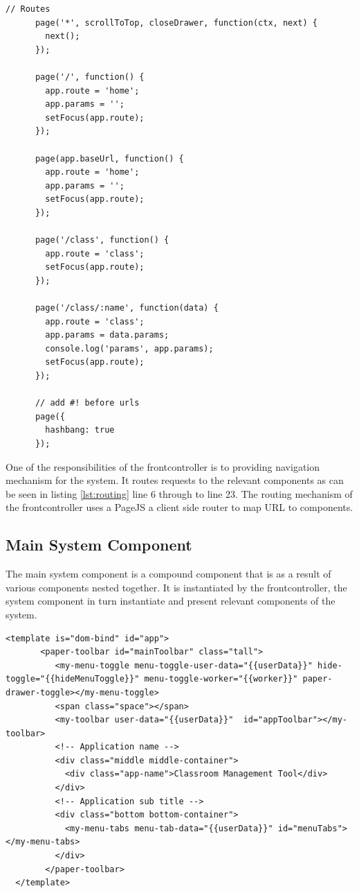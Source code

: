 \begin{lstlisting}[caption={Routing by frontcontroller}, label={lst:routing}]
    // Routes
      page('*', scrollToTop, closeDrawer, function(ctx, next) {
        next();
      });

      page('/', function() {
        app.route = 'home';
        app.params = '';
        setFocus(app.route);
      });

      page(app.baseUrl, function() {
        app.route = 'home';
        app.params = '';
        setFocus(app.route);
      });

      page('/class', function() {
        app.route = 'class';
        setFocus(app.route);
      });

      page('/class/:name', function(data) {
        app.route = 'class';
        app.params = data.params;
        console.log('params', app.params);
        setFocus(app.route);
      });

      // add #! before urls
      page({
        hashbang: true
      });
\end{lstlisting}

One of the responsibilities of the frontcontroller is to providing navigation mechanism for the system. It routes requests to the relevant components as can be seen in listing \ref{lst:routing} line 6 through to line 23. The routing mechanism of the frontcontroller uses a PageJS \cite{website:VisionMedia} a client side router to map URL to components.  

\subsection{Main System Component}
The main system component is a compound component that is as a result of various components nested together. It is instantiated by the frontcontroller, the system component in turn instantiate and present relevant components of the system.

\begin{lstlisting}[caption={System Component Instantiated Declaratively}, label={lst:App}]
   <template is="dom-bind" id="app">
       <paper-toolbar id="mainToolbar" class="tall">
          <my-menu-toggle menu-toggle-user-data="{{userData}}" hide-toggle="{{hideMenuToggle}}" menu-toggle-worker="{{worker}}" paper-drawer-toggle></my-menu-toggle>
          <span class="space"></span>
          <my-toolbar user-data="{{userData}}"  id="appToolbar"></my-toolbar>
          <!-- Application name -->
          <div class="middle middle-container">
            <div class="app-name">Classroom Management Tool</div>
          </div>
          <!-- Application sub title -->
          <div class="bottom bottom-container">
            <my-menu-tabs menu-tab-data="{{userData}}" id="menuTabs"></my-menu-tabs>
          </div>
        </paper-toolbar>
  </template>
\end{lstlisting}

